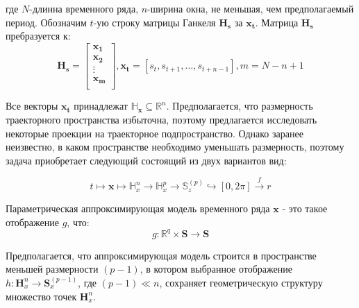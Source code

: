 \documentclass[12pt,twoside]{article}
\begin{document}
где $N$-длинна временного ряда, $n$-ширина окна, не меньшая, чем предполагаемый период. Обозначим $t$-ую строку матрицы Ганкеля $\mathbf{H_{s}}$ за $\mathbf{x_{t}}$. Матрица $\mathbf{H_{s}}$ пребразуется к:	
\begin{equation}
	\mathbf{H_{s}} = 
	\begin{bmatrix} 
                  	\mathbf{x_{1}}\\ \mathbf{x_{2}}\\
                  	\vdots\\
                  	\mathbf{x_{m}}\\
                   \end{bmatrix},
                   \mathbf{x_t}=[s_{t},s_{t+1},\ldots,s_{t+n-1}] ,
                   m = N-n+1
\label{eq:hankel_matrix_2}
\end{equation}
\vspace{\baselineskip}

Все векторы $\mathbf{x_{t}}$ принадлежат $\mathbb{H}_{\mathbf{x}} \subseteq \mathbb{R}^{n}$. Предполагается, что размерность траекторного пространства избыточна, поэтому предлагается исследовать некоторые проекции на траекторное подпространство.
Однако заранее неизвестно, в каком пространстве необходимо уменьшать размерность, поэтому задача приобретает следующий состоящий из двух вариантов вид:

\begin{equation}
	t \mapsto \mathbf{x} \mapsto \mathbb{H}_{x}^{n} \xrightarrow{} \mathbb{H}_{x}^{p} \xrightarrow{} \mathbb{S}_z^{(p)} \hookrightarrow [0,2\pi] \xrightarrow{f} r
\label{eq:goal}
\end{equation}

\vspace{\baselineskip}

\begin{Def}
Параметрическая аппроксимирующая модель временного ряда  $\mathbf{x}$  - это такое отображение $g$, что:
\begin{equation}
	g: \mathbb{R}^{q} \times \mathbf{S} \xrightarrow{} \mathbf{S}
\label{eq:param_model}
\end{equation}
\end{Def}

Предполагается, что аппроксимирующая модель строится в пространстве меньшей размерности $(p-1)$, в котором выбранное отображение $h: \mathbf{H}_{x}^{n} \xrightarrow{} \mathbf{S}_x^{(p-1)} $, где $(p-1)\ll n$, сохраняет геометрическую структуру множество точек $\mathbf{H}_{x}^{n}$. 
\end{document}

